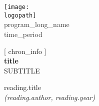 \documentclass[12pt]{article}
\def\logopath{../assets/caiac_logo.png}  %
\def\programlongname{program_long_name}
\def\programlongname{
    {{ program_long_name }}
}
\def\timeperiod{
    {{ time_period }}
}
\def\chroninfo{
    {{ chron_info }}
}
\def\maintitle{
    {{ title }}
}
\def\mainsubtitle{
    {{ subtitle }}
}  %
\begin{document}
\thispagestyle{empty} %

\begin{center}
    \texttt{[image: \\logopath]}\\
    \vspace{0.5em}
    {\Large \textcolor[HTML]{333333}{\programlongname}}\\
    \vspace{0.5em}
    {\textcolor[HTML]{333333}{\timeperiod}}
\end{center}

\vspace{8em}

\begin{center}
    [ \chroninfo ]\\
    \vspace{0.7em}
    {\Huge \textbf{\maintitle}}\\
    \vspace{0.7em}
    \uppercase{\mainsubtitle}
\end{center}

\vfill  %

\begin{center}
\begin{minipage}{0.8\textwidth}  %
\centering
{\color{primaryFaded}
    {\footnotesize
        {{reading.title}}\\
        \emph{({{reading.author}}, {{reading.year}})}
    }
}
\vspace{1em}
\end{minipage}
\end{center}

\vspace{2em}  %
\end{document}

